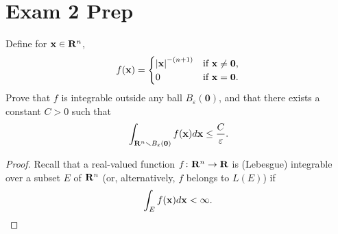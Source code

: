 \section{Exam 2 Prep}
\begin{problem}
Define for $\mathbf{x}\in\mathbf{R}^n$,
\[
f(\mathbf{x})=
\begin{cases}
\left|\mathbf{x}\right|^{-(n+1)}&\text{if $\mathbf{x}\neq \mathbf{0}$,}\\
0&\text{if $\mathbf{x}=\mathbf{0}$.}
\end{cases}
\]
Prove that $f$ is integrable outside any ball $B_\varepsilon(\mathbf{0})$,
and that there exists a constant $C>0$ such that
\[
\int_{\mathbf{R}^n\smallsetminus B_\varepsilon(\mathbf{0})}f(\mathbf{x}) d \mathbf{x}\leq\frac{C}{\varepsilon}.
\]
\end{problem}
\begin{proof}
Recall that a real-valued function $f\colon\mathbf{R}^n\to\mathbf{R}$ is (Lebesgue)
integrable over a subset $E$ of $\mathbf{R}^n$ (or, alternatively, $f$ belongs to
$L(E)$) if
\[
\int_E f(\mathbf{x}) d \mathbf{x}<\infty.
\]


\end{proof}
